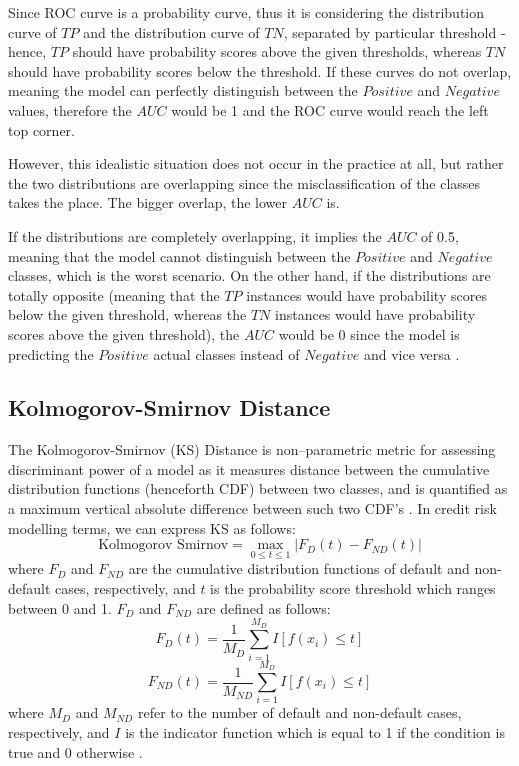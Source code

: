 Since ROC curve is a probability curve, thus it is considering the distribution curve of $TP$ and the distribution curve of $TN$, separated by particular threshold - hence, $TP$ should have probability scores above the given thresholds, whereas $TN$ should have probability scores below the threshold.
If these curves do not overlap, meaning the model can perfectly distinguish between the $Positive$ and $Negative$ values, therefore the $AUC$ would be 1 and the ROC curve would reach the left top corner.

However, this idealistic situation does not occur in the practice at all, but rather the two distributions are overlapping since the misclassification of the classes takes the place.
The bigger overlap, the lower $AUC$ is.

If the distributions are completely overlapping, it implies the $AUC$ of 0.5, meaning that the model cannot distinguish between the $Positive$ and $Negative$ classes, which is the worst scenario.
On the other hand, if the distributions are totally opposite (meaning that the $TP$ instances would have probability scores below the given threshold, whereas the $TN$ instances would have probability scores above the given threshold), the $AUC$ would be 0 since the model is predicting the $Positive$ actual classes instead of $Negative$ and vice versa \citep{narkhede2018understanding}.


\newpage
\subsection{Kolmogorov-Smirnov Distance}

The Kolmogorov-Smirnov (KS) Distance is non--parametric metric for assessing discriminant power of a model as it measures distance between the cumulative distribution functions (henceforth CDF) between two classes, and is quantified as a maximum vertical absolute difference between such two CDF's \citep{adeodato2016equivalence}.
In credit risk modelling terms, we can express KS as follows:
\begin{equation}\label{eq}
    \text{Kolmogorov Smirnov} = \max_{0 \le t \le 1} \left| F_D \left(t \right) - F_{ND} \left(t \right) \right|
\end{equation}
where $F_D$ and $F_{ND}$ are the cumulative distribution functions of default and non-default cases, respectively, and $t$ is the probability score threshold which ranges between 0 and 1. $F_D$ and $F_{ND}$ are defined as follows:
\begin{equation}\label{eq}
    F_D \left(t \right) = \frac{1}{M_D} \sum_{i=1}^{M_D} I \left[f(x_i) \le t \right]
\end{equation}
\begin{equation}\label{eq}
    F_{ND} \left(t \right) = \frac{1}{M_{ND}} \sum_{i=1}^{M_D} I \left[f(x_i) \le t \right]
\end{equation}
where $M_D$ and $M_{ND}$ refer to the number of default and non-default cases, respectively, and $I$ is the indicator function which is equal to 1 if the condition is true and 0 otherwise \citep{doumpos2019analytical}.
 
